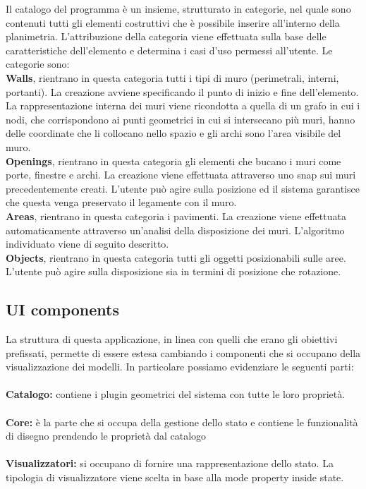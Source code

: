 Il catalogo del programma è un insieme, strutturato in categorie, nel quale sono contenuti tutti gli elementi costruttivi che è possibile inserire all’interno della planimetria. L’attribuzione della categoria viene effettuata sulla base delle caratteristiche dell’elemento e determina i casi d’uso permessi all’utente.
Le categorie sono:\\
\textbf{Walls}, rientrano in questa categoria tutti i tipi di muro (perimetrali, interni, portanti). La creazione avviene specificando il punto di inizio e fine dell’elemento. La rappresentazione interna dei muri viene ricondotta a quella di un grafo in cui i nodi, che corrispondono ai punti geometrici in cui si intersecano più muri, hanno delle coordinate che li collocano nello spazio e gli archi sono l’area visibile del muro.\\
\textbf{Openings}, rientrano in questa categoria gli elementi che bucano i muri come porte, finestre e archi. La creazione viene effettuata attraverso uno snap sui muri precedentemente creati. L’utente può agire sulla posizione ed il sistema garantisce che questa venga preservato il legamente con il muro. \\
\textbf{Areas}, rientrano in questa categoria i pavimenti. La creazione viene effettuata automaticamente attraverso un’analisi della disposizione dei muri. L’algoritmo individuato viene di seguito descritto.\\
\textbf{Objects}, rientrano in questa categoria tutti gli oggetti posizionabili sulle aree. L’utente può agire sulla disposizione sia in termini di posizione che rotazione.\\

\subsection{UI components}

La struttura di questa applicazione, in linea con quelli che erano gli obiettivi prefissati, permette di essere estesa cambiando i componenti che si occupano della visualizzazione dei modelli. In particolare possiamo evidenziare le seguenti parti:\\\\
\textbf{Catalogo:} contiene i plugin geometrici del sistema con tutte le loro proprietà.\\\\
\textbf{Core:} è la parte che si occupa della gestione dello stato e contiene le funzionalità di disegno prendendo le proprietà dal catalogo\\\\
\textbf{Visualizzatori:} si occupano di fornire una rappresentazione dello stato. La tipologia di visualizzatore viene scelta in base alla mode property inside state.\\\\

